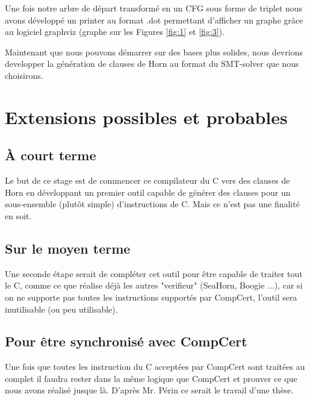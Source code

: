 Une fois notre arbre de départ transformé en un CFG sous forme de triplet nous avons développé un printer au format .dot permettant d'afficher un graphe grâce au logiciel graphviz (graphe sur les Figures \ref{fig:1} et \ref{fig:3}).


%

Maintenant que nous pouvons démarrer sur des bases plus solides, nous devrions developper la génération de clauses de Horn au format du SMT-solver que nous choisirons.




\section{Extensions possibles et probables}
\label{sec:1}
\subsection{\`{A} court terme}
	Le but de ce stage est de commencer ce compilateur du C vers des clauses de Horn en  développant un premier outil capable de générer des clauses pour un sous-ensemble (plutôt simple) d'instructions de C. Mais ce n'est pas une finalité en soit.

\label{sec:2}
\subsection{Sur le moyen terme}
	Une seconde étape serait de compléter cet outil pour être capable de traiter tout le C, comme ce que réalise déjà les autres "verifieur" (SeaHorn, Boogie ...), car si on ne supporte pas toutes les instructions supportés par CompCert, l'outil sera inutilisable (ou peu utilisable). 

\label{sec:3}
\subsection{Pour être synchronisé avec CompCert}
	Une fois que toutes les instruction du C acceptées par CompCert sont traitées au complet il faudra rester dans la même logique que CompCert et prouver ce que nous avons réalisé jusque là. D'après Mr. Périn ce serait le travail d'une thèse. 

